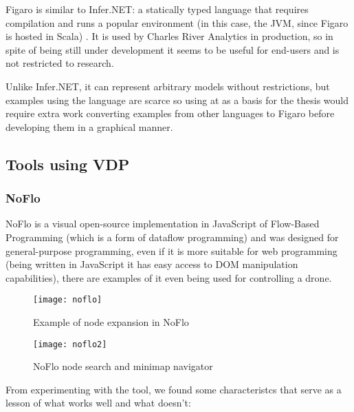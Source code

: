 \begin{itemsize}
Figaro is similar to Infer.NET: a statically typed language that requires compilation
and runs a popular environment (in this case, the JVM, since Figaro is hosted in
Scala) \cite{figarot}. It is used by Charles River Analytics in production, so
in spite of being still under development it seems to be useful for end-users and
is not restricted to research.

Unlike Infer.NET, it can represent arbitrary models without restrictions, but
examples using the language are scarce so using at as a basis for the thesis
would require extra work converting examples from other languages to Figaro
before developing them in a graphical manner.

\subsection{Tools using VDP}

\subsubsection{NoFlo}

NoFlo is a visual open-source implementation in JavaScript of Flow-Based Programming \cite{noflo}
(which is a form of dataflow programming) and was designed for general-purpose
programming, even if it is more suitable for web programming (being written in
JavaScript it has easy access to DOM manipulation capabilities), there are
examples of it even being used for controlling a drone.

\begin{figure}[t]
  \begin{center}
    \leavevmode
    \texttt{[image: noflo]}
    \caption{Example of node expansion in NoFlo \cite{noflo}}
    \label{fig:noflo}
  \end{center}
\end{figure}

\begin{figure}[t]
  \begin{center}
    \leavevmode
    \texttt{[image: noflo2]}
    \caption{NoFlo node search and minimap navigator \cite{noflo}}
    \label{fig:noflo2}
  \end{center}
\end{figure}

From experimenting with the tool, we found some characteristcs that serve as a
lesson of what works well and what doesn't:


\end{itemsize}
